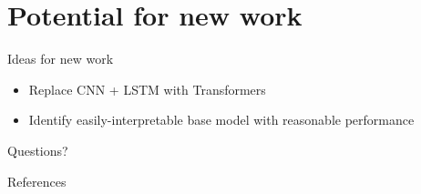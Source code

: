 \documentclass[10pt]{beamer}
\begin{document}
\section{Potential for new work}

\begin{frame}[fragile]{Ideas for new work}
	\begin{itemize}
		\item Replace CNN + LSTM with Transformers \cite{transformers2019}
		\item Identify easily-interpretable base model with reasonable performance
	\end{itemize}
\end{frame}

\begin{frame}[standout]
  Questions?
\end{frame}

\appendix

\begin{frame}[allowframebreaks]{References}

  
  

\end{frame}
\end{document}
